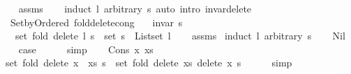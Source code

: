 \begin{isabellebody}
\endisataginvisible
{\isafoldinvisible}%
%
\isadeliminvisible
\isanewline
%
\endisadeliminvisible
%
\isadelimproof
\ \ %
\endisadelimproof
%
\isatagproof
{}\isamarkupfalse%
\ assms\isanewline
\ \ \isamarkupfalse%
\ {\isacharparenleft}{\kern0pt}induct\ l\ arbitrary{\isacharcolon}{\kern0pt}\ s{\isacharparenright}{\kern0pt}\ {\isacharparenleft}{\kern0pt}auto\ intro{\isacharcolon}{\kern0pt}\ invar{\isacharunderscore}{\kern0pt}delete{\isacharparenright}{\kern0pt}%
\endisatagproof
{\isafoldproof}%
%
\isadelimproof
\isanewline
%
\endisadelimproof
%
\isadeliminvisible
\isanewline
%
\endisadeliminvisible
%
\isataginvisible
{}\isamarkupfalse%
\ {\isacharparenleft}{\kern0pt}\ Set{\isacharunderscore}{\kern0pt}by{\isacharunderscore}{\kern0pt}Ordered{\isacharparenright}{\kern0pt}\ fold{\isacharunderscore}{\kern0pt}delete{\isacharunderscore}{\kern0pt}cong{\isacharcolon}{\kern0pt}\isanewline
\ \ \ {\isachardoublequoteopen}invar\ s{\isachardoublequoteclose}\isanewline
\ \ \ {\isachardoublequoteopen}set\ {\isacharparenleft}{\kern0pt}fold\ delete\ l\ s{\isacharparenright}{\kern0pt}\ {\isacharequal}{\kern0pt}\ set\ s\ {\isacharminus}{\kern0pt}\ List{\isachardot}{\kern0pt}set\ l{\isachardoublequoteclose}%
\endisataginvisible
{\isafoldinvisible}%
%
\isadeliminvisible
\isanewline
%
\endisadeliminvisible
%
\isadelimproof
\ \ %
\endisadelimproof
%
\isatagproof
{}\isamarkupfalse%
\ assms\isanewline
{}\isamarkupfalse%
\ {\isacharparenleft}{\kern0pt}induct\ l\ arbitrary{\isacharcolon}{\kern0pt}\ s{\isacharparenright}{\kern0pt}\isanewline
\ \ \isamarkupfalse%
\ Nil\isanewline
\ \ \isamarkupfalse%
\ {\isacharquery}{\kern0pt}case\isanewline
\ \ \ \ \isamarkupfalse%
\ simp\isanewline
{}\isamarkupfalse%
\isanewline
\ \ \isamarkupfalse%
\ {\isacharparenleft}{\kern0pt}Cons\ x\ xs{\isacharparenright}{\kern0pt}\isanewline
\ \ \isamarkupfalse%
\ {\isachardoublequoteopen}set\ {\isacharparenleft}{\kern0pt}fold\ delete\ {\isacharparenleft}{\kern0pt}x\ {\isacharhash}{\kern0pt}\ xs{\isacharparenright}{\kern0pt}\ s{\isacharparenright}{\kern0pt}\ {\isacharequal}{\kern0pt}\ set\ {\isacharparenleft}{\kern0pt}fold\ delete\ xs\ {\isacharparenleft}{\kern0pt}delete\ x\ s{\isacharparenright}{\kern0pt}{\isacharparenright}{\kern0pt}{\isachardoublequoteclose}\isanewline
\ \ \ \ \isamarkupfalse%
\ simp\isanewline
\ \ \isamarkupfalse%
\ \isamarkupfalse%

\end{isabellebody}
